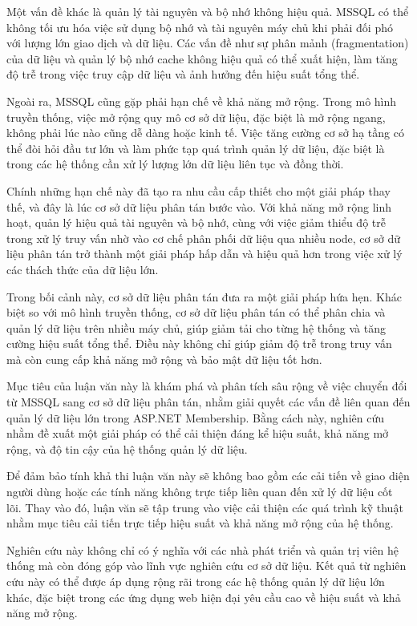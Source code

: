 \documentclass{article}[14pt]
\begin{document}
Một vấn đề khác là quản lý tài nguyên và bộ nhớ không hiệu quả. MSSQL có thể không tối ưu hóa việc sử dụng bộ nhớ và tài nguyên máy chủ khi phải đối phó với lượng lớn giao dịch và dữ liệu. Các vấn đề như sự phân mảnh (fragmentation) của dữ liệu và quản lý bộ nhớ cache không hiệu quả có thể xuất hiện, làm tăng độ trễ trong việc truy cập dữ liệu và ảnh hưởng đến hiệu suất tổng thể.

Ngoài ra, MSSQL cũng gặp phải hạn chế về khả năng mở rộng. Trong mô hình truyền thống, việc mở rộng quy mô cơ sở dữ liệu, đặc biệt là mở rộng ngang, không phải lúc nào cũng dễ dàng hoặc kinh tế. Việc tăng cường cơ sở hạ tầng có thể đòi hỏi đầu tư lớn và làm phức tạp quá trình quản lý dữ liệu, đặc biệt là trong các hệ thống cần xử lý lượng lớn dữ liệu liên tục và đồng thời.

Chính những hạn chế này đã tạo ra nhu cầu cấp thiết cho một giải pháp thay thế, và đây là lúc cơ sở dữ liệu phân tán bước vào. Với khả năng mở rộng linh hoạt, quản lý hiệu quả tài nguyên và bộ nhớ, cùng với việc giảm thiểu độ trễ trong xử lý truy vấn nhờ vào cơ chế phân phối dữ liệu qua nhiều node, cơ sở dữ liệu phân tán trở thành một giải pháp hấp dẫn và hiệu quả hơn trong việc xử lý các thách thức của dữ liệu lớn.

Trong bối cảnh này, cơ sở dữ liệu phân tán đưa ra một giải pháp hứa hẹn. Khác biệt so với mô hình truyền thống, cơ sở dữ liệu phân tán có thể phân chia và quản lý dữ liệu trên nhiều máy chủ, giúp giảm tải cho từng hệ thống và tăng cường hiệu suất tổng thể. Điều này không chỉ giúp giảm độ trễ trong truy vấn mà còn cung cấp khả năng mở rộng và bảo mật dữ liệu tốt hơn.

Mục tiêu của luận văn này là khám phá và phân tích sâu rộng về việc chuyển đổi từ MSSQL sang cơ sở dữ liệu phân tán, nhằm giải quyết các vấn đề liên quan đến quản lý dữ liệu lớn trong ASP.NET Membership. Bằng cách này, nghiên cứu nhằm đề xuất một giải pháp có thể cải thiện đáng kể hiệu suất, khả năng mở rộng, và độ tin cậy của hệ thống quản lý dữ liệu.

Để đảm bảo tính khả thi luận văn này sẽ không bao gồm các cải tiến về giao diện người dùng hoặc các tính năng không trực tiếp liên quan đến xử lý dữ liệu cốt lõi. Thay vào đó, luận văn sẽ tập trung vào việc cải thiện các quá trình kỹ thuật nhằm mục tiêu cải tiến trực tiếp hiệu suất và khả năng mở rộng của hệ thống.


Nghiên cứu này không chỉ có ý nghĩa với các nhà phát triển và quản trị viên hệ thống mà còn đóng góp vào lĩnh vực nghiên cứu cơ sở dữ liệu. Kết quả từ nghiên cứu này có thể được áp dụng rộng rãi trong các hệ thống quản lý dữ liệu lớn khác, đặc biệt trong các ứng dụng web hiện đại yêu cầu cao về hiệu suất và khả năng mở rộng.
\end{document}
